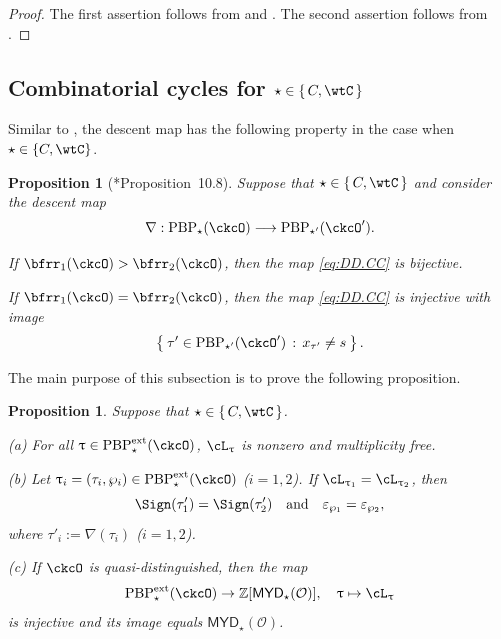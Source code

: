 \documentclass[11pt,a4paper]{amsart}
\def\MYD{{\mathsf{MYD}}}
\newcommand{\CO}{{\mathcal {O}}}
\newcommand{\Z}{\mathbb{Z}}
\def\DD{\nabla}
\numberwithin{equation}{section}
\newtheorem{prop}[thm]{Proposition}
\theoremstyle{remark}
\def\PBPes{\mathrm{PBP}^{\mathrm{ext}}_{\star}}
\def\ckcOp{\ckcO^{\prime}}
\def\PBP{\mathrm{PBP}}
\def\MYD{{\mathsf{MYD}}}
\def\ac{\cL}
\begin{document}
\begin{proof}
 The first assertion follows from    and . 
 The second assertion follows from . 
 \end{proof}


\subsection{Combinatorial cycles for  $\star\in \set{C,\wtC}$}\label{seccwtc}

Similar to , the descent map has  the following property in the case when $\star\in \{C,\wtC\}$.

\begin{prop}[{\cite{BMSZa}*{Proposition~10.8}}]\label{prop:CC.bij}
Suppose that $\star \in \set{C,\wtC}$ and
consider the descent map
\begin{equation}\label{eq:DD.CC}
\nabla: \PBP_\star(\ckcO)\longrightarrow  \PBP_{\star'}(\ckcOp).
\end{equation}
\begin{enuma}
\item If
 $\bfrr_1(\ckcO)>\bfrr_2(\ckcO)$, then
the map \eqref{eq:DD.CC}  is bijective.

\item If   $\bfrr_1(\ckcO)=\bfrr_2(\ckcO)$,
then the  map \eqref{eq:DD.CC} is injective with image 
\[
\Set{\tau'\in \PBP_{\star'}(\ckcOp)\,:\, x_{\tau'}\neq s}.
\]
\end{enuma}
\end{prop}

 The main purpose of this subsection is to prove the following proposition. 
\begin{prop}\label{lem:C}
  Suppose that $\star \in \set{C,\wtC}$. 
  
\noindent (a) For all $\uptau\in \PBPes(\ckcO)$, $\ac_\uptau$ is nonzero and multiplicity free. 

\noindent (b) Let $\uptau_{i} = (\tau_{i},\wp_{i})\in \PBPes(\ckcO)$ ($i=1,2$). If  $\ac_{\uptau_{1}} =  \ac_{\uptau_{2}}$, then
    \[
      \Sign(\tau'_{1})=\Sign(\tau'_{2}) \quad \text{and} \quad
    \varepsilon_{\wp_{1}}=\varepsilon_{\wp_{2}}, \]
    where $\tau'_{i} :=
    \DD(\tau_{i})$ ($i=1,2$).
    
    \noindent (c) If $\ckcO$ is quasi-distinguished, then the map \[
    \PBPes(\ckcO)\rightarrow \Z[\MYD_\star(\CO)],\quad \uptau\mapsto \ac_\uptau
    \]
    is injective and its image equals $\MYD_\star(\CO)$. 
  \end{prop}
\end{document}
